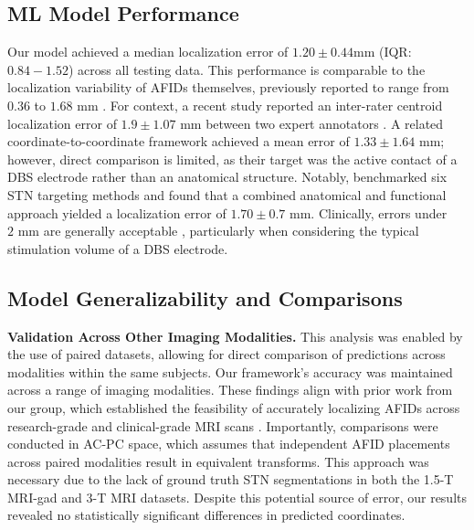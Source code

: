 \subsection{ML Model Performance}
Our model achieved a median localization error of \( 1.20 \pm 0.44\text{mm} \) (IQR: \( 0.84 - 1.52 \)) across all testing data. This performance is comparable to the localization variability of AFIDs themselves, previously reported to range from \( 0.36 \) to \( 1.68 \text{ mm} \) \cite{Lau2019-eh}. For context, a recent study reported an inter-rater centroid localization error of \( 1.9 \pm 1.07 \text{ mm} \) between two expert annotators \cite{Miller2023-ct}. A related coordinate-to-coordinate framework \cite{Engelhardt2021-zd} achieved a mean error of \( 1.33 \pm 1.64 \text{ mm} \); however, direct comparison is limited, as their target was the active contact of a DBS electrode rather than an anatomical structure. Notably, \cite{Guo2007-nf} benchmarked six STN targeting methods and found that a combined anatomical and functional approach yielded a localization error of \( 1.70 \pm 0.7 \text{ mm} \). Clinically, errors under \( 2 \text{ mm} \) are generally acceptable \cite{Kremer2023-if}, particularly when considering the typical stimulation volume of a DBS electrode.

\subsection{Model Generalizability and Comparisons}
\textbf{Validation Across Other Imaging Modalities.} This analysis was enabled by the use of paired datasets, allowing for direct comparison of predictions across modalities within the same subjects. Our framework’s accuracy was maintained across a range of imaging modalities. These findings align with prior work from our group, which established the feasibility of accurately localizing AFIDs across research-grade and clinical-grade MRI scans \cite{Taha2023-gd}. Importantly, comparisons were conducted in AC-PC space, which assumes that independent AFID placements across paired modalities result in equivalent transforms. This approach was necessary due to the lack of ground truth STN segmentations in both the 1.5-T MRI-gad and 3-T MRI datasets. Despite this potential source of error, our results revealed no statistically significant differences in predicted coordinates.

